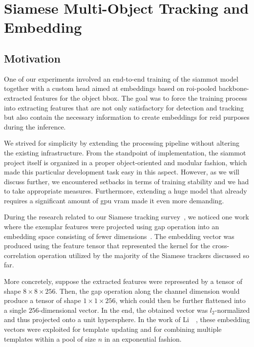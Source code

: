 \section{Siamese Multi-Object Tracking and Embedding}
\label{sec:SiamMOTandFeatureEmb}

\subsection{Motivation}

One of our experiments involved an end-to-end training of the \gls{siammot} model together with a custom head aimed at embeddings based on \gls{roi}-pooled backbone-extracted features for the object \gls{bbox}. The goal was to force the training process into extracting features that are not only satisfactory for detection and tracking but also contain the necessary information to create embeddings for \gls{reid} purposes during the inference.

We strived for simplicity by extending the processing pipeline without altering the existing infrastructure. From the standpoint of implementation, the \gls{siammot} project itself is organized in a proper object-oriented and modular fashion, which made this particular development task easy in this aspect. However, as we will discuss further, we encountered setbacks in terms of training stability and we had to take appropriate measures. Furthermore, extending a huge model that already requires a significant amount of \gls{gpu} \gls{vram} made it even more demanding.

During the research related to our Siamese tracking survey~\cite{ondrasovic2021siamese}, we noticed one work where the exemplar features were projected using \gls{gap} operation into an embedding space consisting of fewer dimensions~\cite{li2020figsiam}. The embedding vector was produced using the feature tensor that represented the kernel for the cross-correlation operation utilized by the majority of the Siamese trackers discussed so far.

More concretely, suppose the extracted features were represented by a tensor of shape $8 \times 8 \times 256$. Then, the \gls{gap} operation along the channel dimension would produce a tensor of shape $1 \times 1 \times 256$, which could then be further flattened into a single $256$-dimensional vector. In the end, the obtained vector was $l_2$-normalized and thus projected onto a unit hypersphere. In the work of Li~\etal{}~\cite{li2020figsiam}, these embedding vectors were exploited for template updating and for combining multiple templates within a pool of size $n$ in an exponential fashion.

